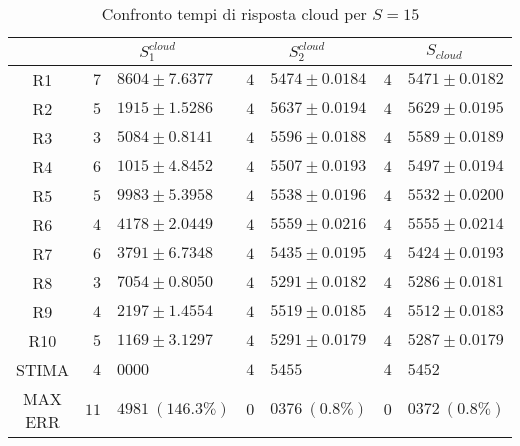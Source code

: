 \begin{table}[!h]
\begin{tabular}{c|r@{.}l|r@{.}l|r@{.}l}
& \multicolumn{2}{|c|}{$S_1^{cloud}$}
& \multicolumn{2}{|c|}{$S_2^{cloud}$}
& \multicolumn{2}{|c}{$S_{cloud}$} 
\\          
\hline
R1      & $7$&$8604 \pm 7.6377$   & $4$&$5474 \pm 0.0184$ & $4$&$5471 \pm 0.0182$ \\
R2      & $5$&$1915 \pm 1.5286$   & $4$&$5637 \pm 0.0194$ & $4$&$5629 \pm 0.0195$ \\
R3      & $3$&$5084 \pm 0.8141$   & $4$&$5596 \pm 0.0188$ & $4$&$5589 \pm 0.0189$ \\
R4      & $6$&$1015 \pm 4.8452$   & $4$&$5507 \pm 0.0193$ & $4$&$5497 \pm 0.0194$ \\
R5      & $5$&$9983 \pm 5.3958$   & $4$&$5538 \pm 0.0196$ & $4$&$5532 \pm 0.0200$ \\
R6      & $4$&$4178 \pm 2.0449$   & $4$&$5559 \pm 0.0216$ & $4$&$5555 \pm 0.0214$ \\
R7      & $6$&$3791 \pm 6.7348$   & $4$&$5435 \pm 0.0195$ & $4$&$5424 \pm 0.0193$ \\
R8      & $3$&$7054 \pm 0.8050$   & $4$&$5291 \pm 0.0182$ & $4$&$5286 \pm 0.0181$ \\
R9      & $4$&$2197 \pm 1.4554$   & $4$&$5519 \pm 0.0185$ & $4$&$5512 \pm 0.0183$ \\
R10     & $5$&$1169 \pm 3.1297$   & $4$&$5291 \pm 0.0179$ & $4$&$5287 \pm 0.0179$ \\
STIMA   & $4$&$0000$              & $4$&$5455$            & $4$&$5452$            \\
MAX ERR & $11$&$4981 \ (146.3\%)$ & $0$&$0376 \ (0.8\%)$  & $0$&$0372 \ (0.8\%)$    
\end{tabular}
\centering
\caption{Confronto tempi di risposta cloud per $S=15$}
\label{tab:15_scloud}
\end{table}
